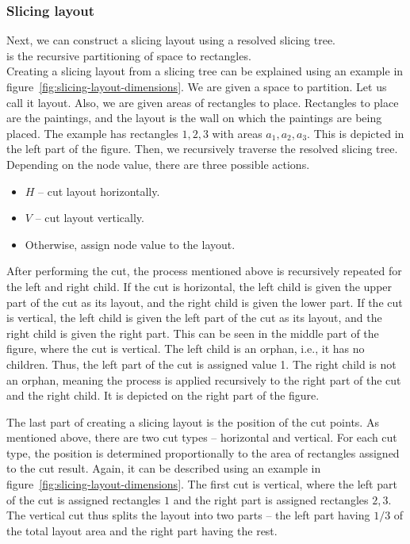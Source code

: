 \subsubsection*{Slicing layout}

Next, we can construct a slicing layout using a resolved slicing tree.\\

 is the recursive partitioning of space to rectangles.\\

Creating a slicing layout from a slicing tree can be explained using an
example in figure~\ref{fig:slicing-layout-dimensions}.
We are given a space to partition. Let us call it layout. Also, we are given areas of rectangles to place.
Rectangles to place are the paintings, and the layout is the wall on which the paintings are being placed.
The example has rectangles $1,2,3$ with areas $a_1, a_2, a_3$.
This is depicted in the left part of the figure.
Then, we recursively traverse the resolved slicing tree.
Depending on the node value, there are three possible actions.

\begin{itemize}
    \item $H$ – cut layout horizontally.
    \item $V$ – cut layout vertically.
    \item Otherwise, assign node value to the layout.
\end{itemize}

After performing the cut, the process mentioned above is recursively repeated
for the left and right child.
If the cut is horizontal, the left child is given the upper part of the cut as its layout, and the right child is given the lower part.
If the cut is vertical, the left child is given the left part of the cut as its layout, and the right child is given the right part.
This can be seen in the middle part of the figure, where the cut is vertical.
The left child is an orphan, i.e., it has no children.
Thus, the left part of the cut is assigned value 1.
The right child is not an orphan, meaning the process is applied recursively to the right part of the cut and the right child.
It is depicted on the right part of the figure.

The last part of creating a slicing layout is the position of the cut points.
As mentioned above, there are two cut types – horizontal and vertical.
For each cut type, the position is determined proportionally to the area of rectangles assigned to the cut result.
Again, it can be described using an example in figure~\ref{fig:slicing-layout-dimensions}.
The first cut is vertical, where the left part of the cut is assigned rectangles $1$ and the right part is assigned rectangles $2,3$.
The vertical cut thus splits the layout into two parts – the left part having $1/3$ of the total layout area and the right part
having the rest.


